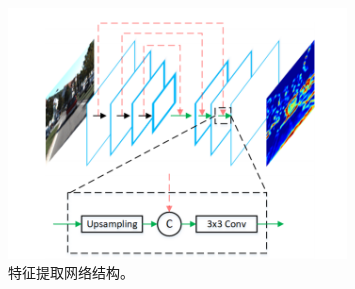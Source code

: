 \begin{figure}
	\centering
	\includegraphics[width=0.8\textwidth]{imgs/feature-extractor.png}
	\caption{特征提取网络结构。}
	\label{fig:feature_extractor}
\end{figure}
